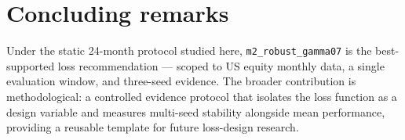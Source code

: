 \section{Concluding remarks}

\label{sec:concluding-remarks}

Under the static 24-month protocol studied here, \texttt{m2\_robust\_gamma07} is the best-supported loss recommendation --- scoped to US equity monthly data, a single evaluation window, and three-seed evidence. The broader contribution is methodological: a controlled evidence protocol that isolates the loss function as a design variable and measures multi-seed stability alongside mean performance, providing a reusable template for future loss-design research.
